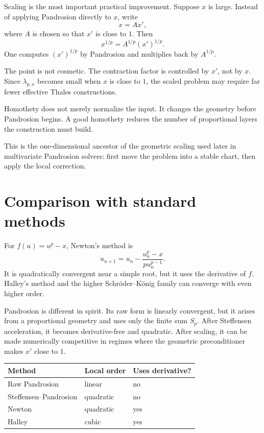 \documentclass[11pt,a4paper]{article}
\theoremstyle{plain}
\theoremstyle{definition}
\theoremstyle{remark}
\newcommand{\Sp}{S_p}
\newenvironment{takeaway}{%
  \begin{center}\begin{minipage}{0.92\linewidth}\small\itshape\color{blue!45!black}%
}{%
  \end{minipage}\end{center}%
}
\begin{document}
Scaling is the most important practical improvement.  Suppose $x$ is large.
Instead of applying Pandrosion directly to $x$, write
\begin{equation}
  x=A x',
  \label{eq:scaling-factor}
\end{equation}
where $A$ is chosen so that $x'$ is close to $1$.  Then
\[
  x^{1/p}=A^{1/p}(x')^{1/p}.
\]
One computes $(x')^{1/p}$ by Pandrosion and multiplies back by $A^{1/p}$.

The point is not cosmetic.  The contraction factor is controlled by $x'$, not
by $x$.  Since $\lambda_{p,x}$ becomes small when $x$ is close to $1$, the
scaled problem may require far fewer effective Thales constructions.

\begin{takeaway}
Homothety does not merely normalize the input.  It changes the geometry before
Pandrosion begins.  A good homothety reduces the number of proportional layers
the construction must build.
\end{takeaway}

This is the one-dimensional ancestor of the geometric scaling used later in
multivariate Pandrosion solvers: first move the problem into a stable chart,
then apply the local correction.

\section{Comparison with standard methods}
\label{sec:comparison}

For $f(u)=u^p-x$, Newton's method is
\[
  u_{n+1}=u_n-\frac{u_n^p-x}{p u_n^{p-1}}.
\]
It is quadratically convergent near a simple root, but it uses the derivative
of $f$.  Halley's method and the higher Schröder--König family can converge
with even higher order.

Pandrosion is different in spirit.  Its raw form is linearly convergent, but it
arises from a proportional geometry and uses only the finite sum $\Sp$.  After
Steffensen acceleration, it becomes derivative-free and quadratic.  After
scaling, it can be made numerically competitive in regimes where the geometric
preconditioner makes $x'$ close to $1$.

\begin{center}
\begin{tabular}{@{}lll@{}}
\toprule
Method & Local order & Uses derivative? \\
\midrule
Raw Pandrosion & linear & no \\
Steffensen--Pandrosion & quadratic & no \\
Newton & quadratic & yes \\
Halley & cubic & yes \\
\bottomrule
\end{tabular}
\end{center}
\end{document}
